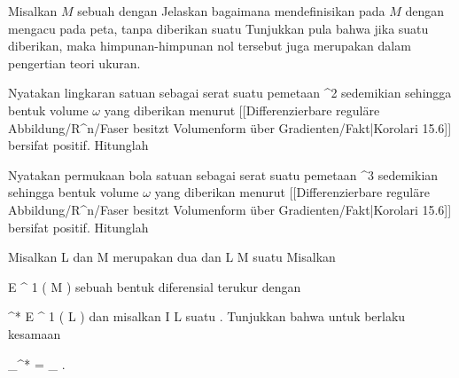 {}
{

Misalkan $M$ sebuah
dengan
Jelaskan bagaimana mendefinisikan  pada $M$ dengan mengacu pada peta, tanpa diberikan suatu
Tunjukkan pula bahwa jika suatu
diberikan, maka himpunan-himpunan nol tersebut juga merupakan
dalam pengertian teori ukuran.

}
{} {}

{}
{

Nyatakan lingkaran satuan
 sebagai serat suatu pemetaan
\maabbdisp {} {\R^2} {\R
} {}
sedemikian sehingga bentuk volume $\omega$ yang diberikan menurut
[[Differenzierbare reguläre Abbildung/R^n/Faser besitzt Volumenform über Gradienten/Fakt|Korolari 15.6]]
bersifat positif. Hitunglah

}
{} {}

{}
{

Nyatakan permukaan bola satuan
 sebagai serat suatu pemetaan
\maabbdisp {} {\R^3} {\R
} {}
sedemikian sehingga bentuk volume $\omega$ yang diberikan menurut
[[Differenzierbare reguläre Abbildung/R^n/Faser besitzt Volumenform über Gradienten/Fakt|Korolari 15.6]]
bersifat positif. Hitunglah

}
{} {}

{}
{

Misalkan
\mathkor {} {L} {dan} {M} {}
merupakan dua
dan
\maabbdisp {\varphi} { L } { M
} {}
suatu
Misalkan

\mavergleichskette
{\vergleichskette
{ \omega
}
{ \in }{
{ \mathcal E }^{  1 } (  M   )
}
{  }{
}
{    }{
}
{   }{
}
}
{}{}{}
sebuah bentuk diferensial terukur dengan

\mavergleichskette
{\vergleichskette
{ \varphi^*\omega
}
{ \in }{
{ \mathcal E }^{  1 } (  L   )
}
{  }{
}
{    }{
}
{   }{
}
}
{}{}{}
dan misalkan
\maabbdisp {\gamma} { I } { L
} {}
suatu
 {} {.}
Tunjukkan bahwa untuk
berlaku kesamaan

\mavergleichskettedisp
{\vergleichskette
{ \int_\gamma \varphi^* \omega
}
{ =} { \int_{\varphi \circ \gamma} \omega
}
{ } {
}
{ } {
}
{ } {
}
}
{}{}{.}

}
{} {}

